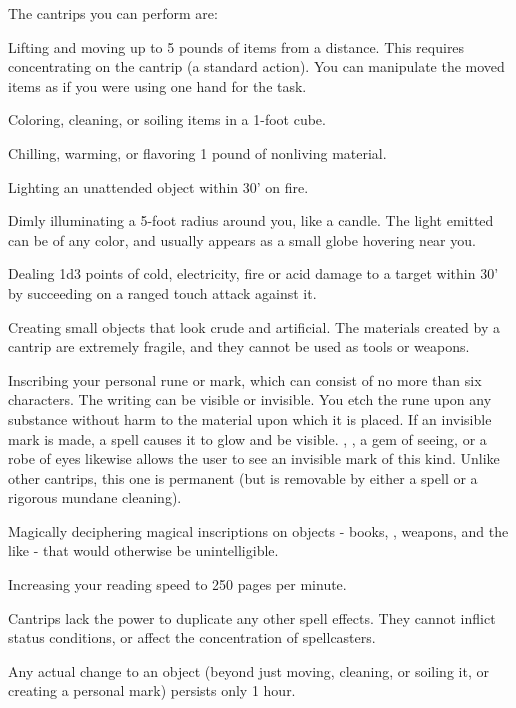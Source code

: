 The cantrips you can perform are:
\begin{list}{}{\leftmargin=1em}
 \item Lifting and moving up to 5 pounds of items from a distance.
This requires concentrating on the cantrip (a standard action).
You can manipulate the moved items as if you were using one hand for the task.
 \item Coloring, cleaning, or soiling items in a 1-foot cube.
 \item Chilling, warming, or flavoring 1 pound of nonliving material. 
 \item Lighting an unattended object within 30' on fire.
 \item Dimly illuminating a 5-foot radius around you, like a candle. 
The light emitted can be of any color, and usually appears as a small globe hovering near you. 
 \item Dealing 1d3 points of cold, electricity, fire or acid damage to a target within 30' by succeeding on a ranged touch attack against it.
 \item Creating small objects that look crude and artificial. 
The materials created by a cantrip are extremely fragile, and they cannot be used as tools or weapons. 
 \item Inscribing your personal rune or mark, which can consist of no more than six characters. 
The writing can be visible or invisible. 
You etch the rune upon any substance without harm to the material upon which it is placed. 
If an invisible mark is made, a  spell causes it to glow and be visible.
, , a gem of seeing, or a robe of eyes likewise allows the user to see an invisible mark of this kind. 
Unlike other cantrips, this one is permanent (but is removable by either a  spell or a rigorous mundane cleaning).
 \item Magically deciphering magical inscriptions on objects - books, , weapons, and the like - that would otherwise be unintelligible.
 \item Increasing your reading speed to 250 pages per minute.
\end{list}

Cantrips lack the power to duplicate any other spell effects.
They cannot inflict status conditions, or affect the concentration of spellcasters.

Any actual change to an object (beyond just moving, cleaning, or soiling it, or creating a personal mark) persists only 1 hour.
